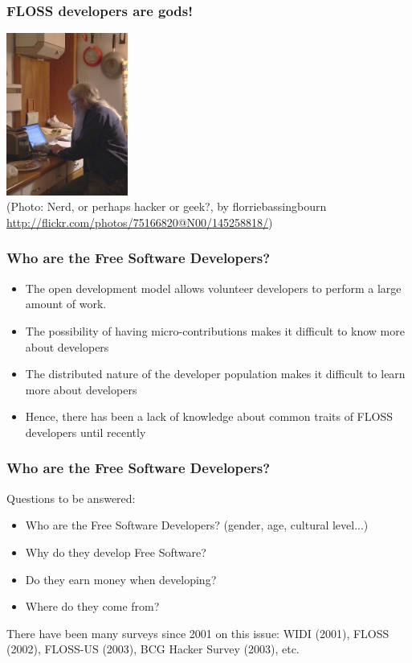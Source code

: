 \documentclass{beamer}
\begin{document}
\begin{frame}
\frametitle{FLOSS developers are gods!}

\begin{center}
\includegraphics[width=4cm]{figs/hacker.jpg} \\
(Photo: Nerd, or perhaps hacker or geek?, by florriebassingbourn\\
\url{http://flickr.com/photos/75166820@N00/145258818/})
\end{center}

\end{frame}

\begin{frame}
\frametitle{Who are the Free Software Developers?}

\begin{itemize}
\item The open development model allows volunteer developers to perform
a large amount of work. 
\item The possibility of having micro-contributions makes it difficult to know
more about developers
\item The distributed nature of the developer population makes it difficult to
learn more about developers
\item Hence, there has been a lack of knowledge about common traits of FLOSS developers until
recently
\end{itemize}

\end{frame}


\begin{frame}
\frametitle{Who are the Free Software Developers?}

Questions to be answered:

\begin{itemize}
\item Who are the Free Software Developers? (gender, age, cultural level...)
\item Why do they develop Free Software?
\item Do they earn money when developing?
\item Where do they come from?
\end{itemize}

There have been many surveys since 2001 on this issue: WIDI (2001), FLOSS
(2002), FLOSS-US (2003), BCG Hacker Survey (2003), etc.

\end{frame}
\end{document}
